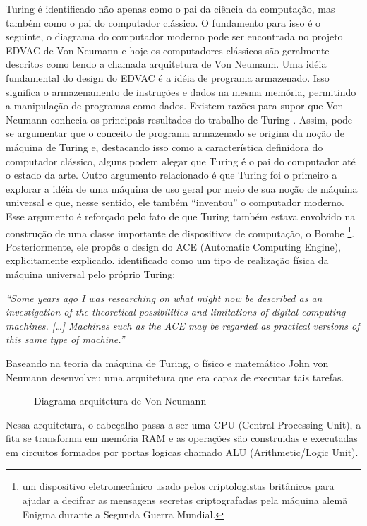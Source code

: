 Turing é identificado não apenas como o pai da ciência da computação, mas também como o pai do computador clássico. O fundamento para isso é o seguinte, o diagrama do computador moderno pode ser encontrada no projeto EDVAC de Von Neumann \cite{9} e hoje os computadores clássicos são geralmente descritos como tendo a chamada arquitetura de Von Neumann. Uma idéia fundamental do design do EDVAC é a idéia de programa armazenado. Isso significa o armazenamento de instruções e dados na mesma memória, permitindo a manipulação de programas como dados. Existem razões para supor que Von Neumann conhecia os principais resultados do trabalho de Turing \cite{10}. Assim, pode-se argumentar que o conceito de programa armazenado se origina da noção de máquina de Turing e, destacando isso como a característica definidora do computador clássico, alguns podem alegar que Turing é o pai do computador até o estado da arte. Outro argumento relacionado é que Turing foi o primeiro a explorar a idéia de uma máquina de uso geral por meio de sua noção de máquina universal e que, nesse sentido, ele também “inventou” o computador moderno. Esse argumento é reforçado pelo fato de que Turing também estava envolvido na construção de uma classe importante de dispositivos de computação, o Bombe \footnote{um dispositivo eletromecânico usado pelos criptologistas britânicos para ajudar a decifrar as mensagens secretas criptografadas pela máquina alemã Enigma durante a Segunda Guerra Mundial.}. Posteriormente, ele propôs o design do ACE (Automatic Computing Engine), explicitamente explicado. identificado como um tipo de realização física da máquina universal pelo próprio Turing:

\textit{
  ``Some years ago I was researching on what might now be described as an investigation of the theoretical possibilities and limitations of digital computing machines. […] Machines such as the ACE may be regarded as practical versions of this same type of machine.'' \cite{11}
}

Baseando na teoria da máquina de Turing, o físico e matemático John von Neumann desenvolveu uma arquitetura que era capaz de executar tais tarefas.

\begin{figure}[H] \centering 
  \caption{\label{fig:1} Diagrama arquitetura de Von Neumann} 
\end{figure}

Nessa arquitetura, o cabeçalho passa a ser uma CPU (Central Processing Unit), a fita se transforma em memória RAM e as operações são construidas e executadas em circuitos formados por portas logicas  chamado ALU (Arithmetic/Logic Unit). \cite{12}

